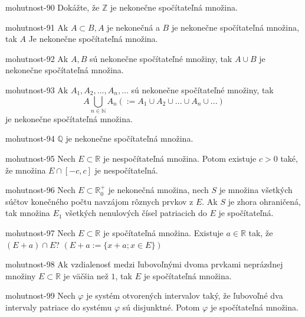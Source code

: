 \begin{defproblem}{mohutnost-90}
Dokážte, že $\mathbb{Z}$ je nekonečne spočítateľná množina.
\end{defproblem}

\begin{defproblem}{mohutnost-91}
Ak $A\subset B,A$ je nekonečná a $B$ je nekonečne spočítateľná množina, tak $A$ Je nekonečne spočítateľná množina.
\end{defproblem}

\begin{defproblem}{mohutnost-92}
Ak $A,B$ sú nekonečne spočítateľné množiny, tak $A\cup B$ je nekonečne spočítateľná množina.
\end{defproblem}

\begin{defproblem}{mohutnost-93}
Ak $A_1,A_2,...,A_n,...$ sú nekonečne spočítateľné množiny, tak
\[
  A \bigcup_{n \in\mathbb{N}}A_n (:=A_1\cup A_2\cup ...\cup A_n \cup ...)
\]
je nekonečne spočítateľná množina.
\end{defproblem}

\begin{defproblem}{mohutnost-94}
$\mathbb{Q}$ je nekonečne spočítateľná množina.
\end{defproblem}

\begin{defproblem}{mohutnost-95}
Nech $E\subset\mathbb{R}$ je nespočítateľná množina. Potom existuje $c>0$ také, že množina $E\cap [-c,c]$ je nespočítateľná.
\end{defproblem}

\begin{defproblem}{mohutnost-96}
Nech $E\subset\mathbb{R}_0^+$ je nekonečná množina, nech $S$ je množina všetkých súčtov konečného počtu navzájom rôznych prvkov z $E$. Ak $S$ je zhora ohraničená, tak množina $E_1$ všetkých nenulových čísel patriacich do $E$ je spočítateľná.
\end{defproblem}

\begin{defproblem}{mohutnost-97}
Nech $E\subset\mathbb{R}$ je spočítateľná množina. Existuje $a\in\mathbb{R}$ tak, že $(E+a)\cap E$? $(E+a:=\{x+a;x\in E\})$
\end{defproblem}

\begin{defproblem}{mohutnost-98}
Ak vzdialenosť medzi ľubovoľnými dvoma prvkami neprázdnej množiny $E\subset\mathbb{R}$ je väčšia než $1$, tak $E$ je spočítateľná množina.
\end{defproblem}

\begin{defproblem}{mohutnost-99}
Nech $\varphi$ je systém otvorených intervalov taký, že ľubovoľné dva intervaly patriace do systému $\varphi$ sú disjunktné. Potom $\varphi$ je spočítateľná množina.
\end{defproblem}